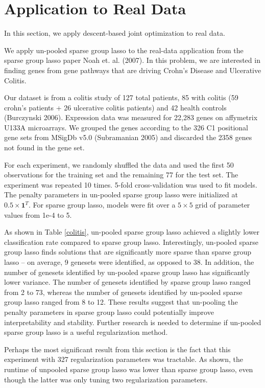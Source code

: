 \documentclass[10pt,letterpaper]{article}
\begin{document}
\section{Application to Real Data}
In this section, we apply descent-based joint optimization to real data.

We apply un-pooled sparse group lasso to the real-data application from the sparse group lasso paper Noah et. al. (2007). In this problem, we are interested in finding genes from gene pathways that are driving Crohn's Disease and Ulcerative Colitis.

Our dataset is from a colitis study of 127 total patients, 85 with colitis (59 crohn's patients + 26 ulcerative colitis patients) and 42 health controls (Burczynski 2006). Expression data was measured for 22,283 genes on affymetrix U133A microarrays. We grouped the genes according to the 326 C1 positional gene sets from MSigDb v5.0 (Subramanian 2005) and discarded the 2358 genes not found in the gene set.

For each experiment, we randomly shuffled the data and used the first 50 observations for the training set and the remaining 77 for the test set. The experiment was repeated 10 times. 5-fold cross-validation was used to fit models. The penalty parameters in un-pooled sparse group lasso were initialized at $0.5 \times \boldsymbol 1^T$. For sparse group lasso, models were fit over a $5 \times 5$ grid of parameter values from 1e-4 to 5.

As shown in Table \ref{colitis}, un-pooled sparse group lasso achieved a slightly lower classification rate compared to sparse group lasso. Interestingly, un-pooled sparse group lasso finds solutions that are significantly more sparse than sparse group lasso -- on average, 9 genesets were identified, as opposed to 38. In addition, the number of genesets identified by un-pooled sparse group lasso has significantly lower variance. The number of genesets identified by sparse group lasso ranged from 2 to 73, whereas the number of genesets identified by un-pooled sparse group lasso ranged from 8 to 12. These results suggest that un-pooling the penalty parameters in sparse group lasso could potentially improve interpretability and stability. Further research is needed to determine if un-pooled sparse group lasso is a useful regularization method.

Perhaps the most significant result from this section is the fact that this experiment with 327 regularization parameters was tractable. As shown, the runtime of unpooled sparse group lasso was lower than sparse group lasso, even though the latter was only tuning two regularization parameters.
\end{document}
